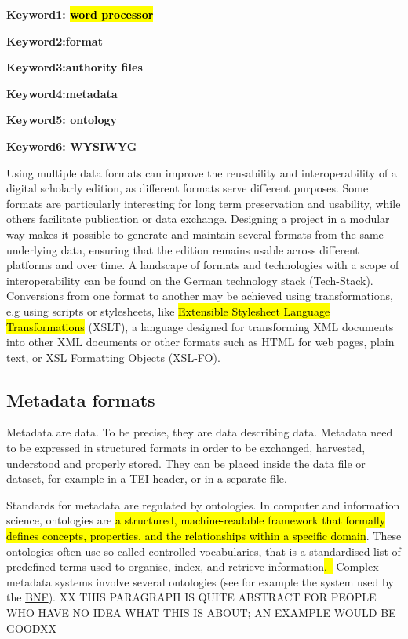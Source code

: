 \documentclass[
  letterpaper,
  DIV=11,
  numbers=noendperiod]{scrreprt}
\begin{document}
\textbf{Keyword1: \hl{word processor}}

\textbf{Keyword2:format}

\textbf{Keyword3:authority files}

\textbf{Keyword4:metadata}

\textbf{Keyword5: ontology}

\textbf{Keyword6: WYSIWYG}

Using multiple data formats can improve the reusability and
interoperability of a digital scholarly edition, as different formats
serve different purposes. Some formats are particularly interesting for
long term preservation and usability, while others facilitate
publication or data exchange. Designing a project in a modular way makes
it possible to generate and maintain several formats from the same
underlying data, ensuring that the edition remains usable across
different platforms and over time. A landscape of formats and
technologies with a scope of interoperability can be found on the German
technology stack (Tech-Stack). Conversions from one format to another
may be achieved using transformations, e.g using scripts or stylesheets,
like \hl{Extensible Stylesheet Language Transformations} (XSLT), a
language designed for transforming XML documents into other XML
documents or other formats such as HTML for web pages, plain text, or
XSL Formatting Objects (XSL-FO).

\subsection{Metadata formats}\label{metadata-formats}

Metadata are data. To be precise, they are data describing data.
Metadata need to be expressed in structured formats in order to be
exchanged, harvested, understood and properly stored. They can be placed
inside the data file or dataset, for example in a TEI header, or in a
separate file.

Standards for metadata are regulated by ontologies. In computer and
information science, ontologies are \hl{a structured, machine-readable
framework that formally defines concepts, properties, and the
relationships within a specific domain}. These ontologies often use so
called controlled vocabularies, that is a standardised list of
predefined terms used to organise, index, and retrieve
information\hl{.~} Complex metadata systems involve several ontologies
(see for example the system used by the
\href{https://data.bnf.fr/semanticweb\#Ancre3}{BNF}). XX THIS PARAGRAPH
IS QUITE ABSTRACT FOR PEOPLE WHO HAVE NO IDEA WHAT THIS IS ABOUT; AN
EXAMPLE WOULD BE GOODXX
\end{document}
